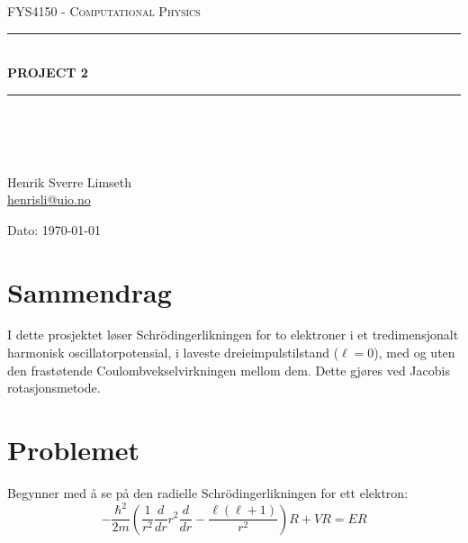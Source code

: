 \documentclass[norsk, 12pt]{article}
\newcommand{\f}{\frac}
\newcommand{\ddr}{\frac{d}{dr}}
\begin{document}
\begin{titlepage}
\begin{center}

\textsc{\Large FYS4150 - Computational Physics}\\[0.5cm]
\rule{\linewidth}{0.5mm} \\[0.4cm]
{ \huge \bfseries  PROJECT 2}\\[0.10cm]
\rule{\linewidth}{0.5mm} \\[1.5cm]
\textsc{\Large }\\[1.5cm]
\textsc{}\\[1.5cm]

\begin{minipage}{0.49\textwidth}
    \begin{center} \large
        Henrik Sverre Limseth\\ \url{henrisli@uio.no} \\[0.8cm]
    \end{center}
\end{minipage}


\large{Dato: \today}

\end{center}
\end{titlepage}

\section{Sammendrag}
I dette prosjektet løser Schrödingerlikningen for to elektroner i et tredimensjonalt harmonisk
oscillatorpotensial, i laveste dreieimpulstilstand ($\ell=0$), med og uten den frastøtende Coulombvekselvirkningen mellom dem. Dette gjøres ved Jacobis 
rotasjonsmetode.

\section{Problemet}
Begynner med å se på den radielle Schrödingerlikningen for ett elektron:
\small
$$ -\f{\hbar^2}{2m}\left(\f{1}{r^2}\ddr r^2\ddr -\f{\ell(\ell+1)}{r^2}\right)R + VR=ER$$
\end{document}
